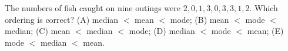 The numbers of fish caught on nine outings were $2,0,1,3,0,3,3,1,2$. Which ordering is correct? (A) median $<$ mean $<$ mode; (B) mean $<$ mode $<$ median; (C) mean $<$ median $<$ mode; (D) median $<$ mode $<$ mean; (E) mode $<$ median $<$ mean.
